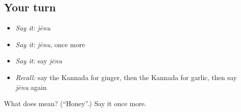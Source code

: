 \subsection*{Your turn}
\begin{itemize}
\raggedright
  \item \emph{Say it:} \emph{jēnu}
  \item \emph{Say it:} \emph{jēnu}, once more
  \item \emph{Say it:} say \emph{jēnu}
  \item \emph{Recall:} say the Kannada for ginger, then the Kannada for garlic, then say \emph{jēnu} again
\end{itemize}

\begin{tcolorbox}[breakable,colback=teal!4,colframe=teal!35!black,title={Before you move on}]
What does  mean? (\textquotedblleft{}Honey\textquotedblright{}.) Say it once more.
\end{tcolorbox}
